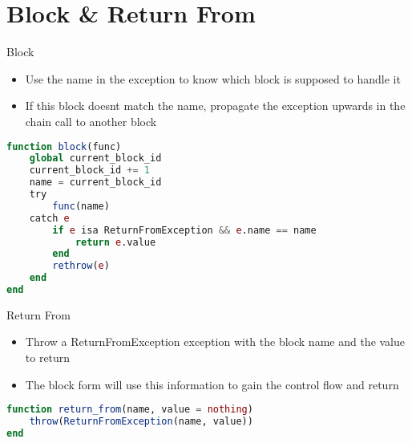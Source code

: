 \documentclass{beamer}
\begin{document}
\section{Block \& Return From}

\begin{frame}[fragile,t]{Block}
\begin{itemize}
  \item Use the name in the exception to know which block is supposed to handle it
  \item If this block doesnt match the name, propagate the exception upwards in the chain call to another block
\end{itemize}
\vfill
\begin{lstlisting}[language=julia, style=jlcodestyle]
function block(func)
    global current_block_id
    current_block_id += 1
    name = current_block_id
    try
        func(name)
    catch e
        if e isa ReturnFromException && e.name == name
            return e.value
        end
        rethrow(e)
    end
end
\end{lstlisting}
\end{frame}


\begin{frame}[fragile,t]{Return From}
\begin{itemize}
  \item Throw a ReturnFromException exception with the block name and the value to return
  \item The block form will use this information to gain the control flow and return 
\end{itemize}
\vfill
\begin{lstlisting}[language=julia, style=jlcodestyle]
function return_from(name, value = nothing)
    throw(ReturnFromException(name, value))
end
\end{lstlisting}
\end{frame}

\end{document}
